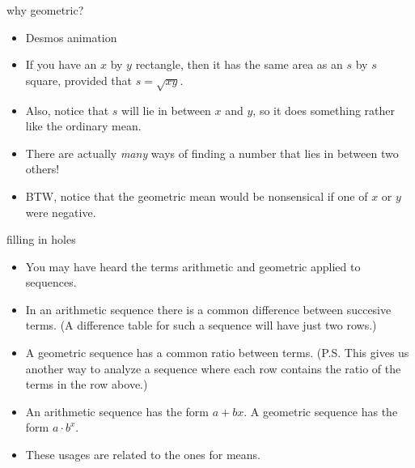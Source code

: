 \documentclass[landscape]{beamer}
\begin{document}
\begin{frame}{why geometric?}
\begin{itemize}
\item Desmos animation \pause
\item If you have an $x$ by $y$ rectangle, then it has the same area as an $s$ by $s$ square, provided that $s=\sqrt{xy}$. \pause
\item Also, notice that $s$ will lie in between $x$ and $y$, so it does something rather like the ordinary mean.\pause
\item There are actually {\em many} ways of finding a number that lies in between two others! \pause
\item BTW, notice that the geometric mean would be  nonsensical if one of $x$ or $y$ were negative. 
\end{itemize}
\end{frame}

\begin{frame}{filling in holes}
\begin{itemize}
\item You may have heard the terms arithmetic and geometric applied to sequences. \pause
\item In an arithmetic sequence there is a common difference between succesive terms. \pause \newline
(A difference table for such a sequence will have just two rows.) \pause
\item A geometric sequence has a common ratio between terms. \pause \newline
(P.S. This gives us another way to analyze a sequence where each row contains the ratio of the terms in the row above.) \pause
\item An arithmetic sequence has the form $a+bx$. \pause A geometric sequence has the form $a\cdot b^x$. \pause
\item These usages are related to the ones for means.
\end{itemize}
\end{frame}
\end{document}
